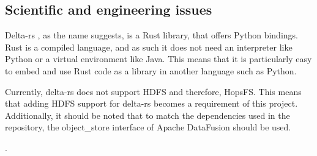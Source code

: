 
\subsection{Scientific and engineering issues}
Delta-rs \cite{DeltaioDeltars2024}, as the name suggests, is a Rust \cite{RustProgrammingLanguage} library, that offers Python bindings. Rust is a compiled language, and as such it does not need an interpreter like Python or a virtual environment like Java. This means that it is particularly easy to embed and use Rust code as a library in another language such as Python. 

Currently, delta-rs does not support \gls{HDFS} and therefore, HopsFS\cite{niaziHopsFSScalingHierarchical2017}. This means that adding \gls{HDFS} support for delta-rs becomes a requirement of this project. Additionally, it should be noted that to match the dependencies used in the repository, the object\_store \cite{Object_storeRust} interface of Apache DataFusion \cite{ApacheDataFusionApache} should be used.

.